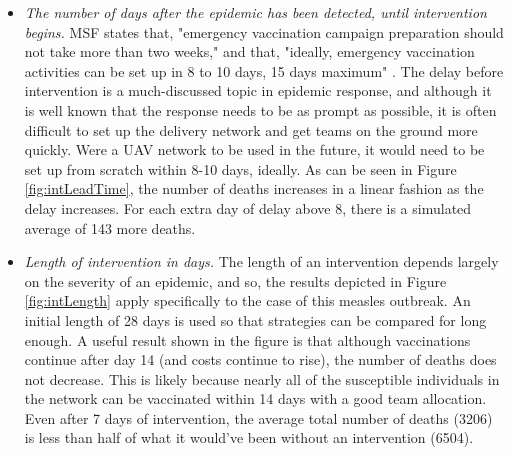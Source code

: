 \begin{itemize}
    \item \textit{The number of days after the epidemic has been detected, until intervention begins.} MSF states that,
    "emergency vaccination campaign preparation should not take more than two weeks," and that, "ideally, emergency vaccination activities can be set up in 8 to 10 days, 15 days maximum" 
    \cite{danet_fermon_2013}. The delay before intervention is a much-discussed topic in epidemic response, and although it is well known that the response needs to be as prompt as possible, it is often difficult to set up the delivery network and get teams on the ground more quickly. Were a UAV network to be used in the future, it would need to be set up from scratch within 8-10 days, ideally. As can be seen in Figure \ref{fig:intLeadTime}, the number of deaths increases in a linear fashion as the delay increases. For each extra day of delay above 8, there is a simulated average of 143 more deaths.
    
    \item \textit{Length of intervention in days.} The length of an intervention depends largely on the severity of an epidemic, and so, the results depicted in Figure \ref{fig:intLength} apply specifically to the case of this measles outbreak. An initial length of 28 days is used so that strategies can be compared for long enough. A useful result shown in the figure is that although vaccinations continue after day 14 (and costs continue to rise), the number of deaths does not decrease. This is likely because nearly all of the susceptible individuals in the network can be vaccinated within 14 days with a good team allocation. Even after 7 days of intervention, the average total number of deaths (3206) is less than half of what it would've been without an intervention (6504).
\end{itemize}